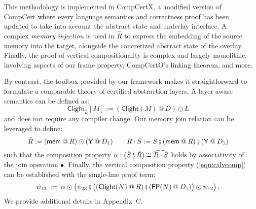 \documentclass[acmsmall,screen,review,nonacm]{acmart}
\newcommand{\kw}[1]{\ensuremath{ \mathsf{#1} }}
\newcommand{\jr}{\mathsf{Y}}
\newcommand{\vcomp}{\fatsemi}
\begin{document}
This methodology is implemented in CompCertX,
a~modified version of CompCert where
every language semantics and correctness proof
has been updated
to take into account the abstract state and underlay interface.
A complex \emph{memory injection} is used in $\hat{R}$
to express the embedding of the source memory into the target,
alongside the concretized abstract state of the overlay.
Finally, the proof of vertical compositionality
is complex and largely monolithic,
involving aspects of
our frame property,
CompCertO's linking theorem, and more.

By contrast,
the toolbox provided by our framework
makes it straightforward to formulate a comparable theory
of certified abstraction layers.
A layer-aware semantics can be defined as:
\[
  \kw{Clight}_L[M] := (\kw{Clight}(M) \mathbin@ D) \odot L
\]
and does not require any compiler change.
Our memory join relation can be leveraged to define:
\[
  \hat{R} := 
    (\kw{mem} \mathbin@ R) \odot (\jr \mathbin@ D_1)
  \qquad
  R \cdot S :=
    S \vcomp (\kw{mem} \mathbin@ R) \vcomp (\jr \mathbin@ D_1)
\]
such that the composition property
$\alpha : (\hat{S} \vcomp \hat{R}) \cong \widehat{R \cdot S}$
holds by associativity of the join operation $\bullet$.
Finally,
the vertical composition property (\ref{eqn:calvcomp})
can be established with the single-line proof term:
\[
  \psi_{13} \: := \:
    \alpha \odot \big(
    \psi_{23} \vcomp
    \big( (\kw{Clight}(N) \mathbin@ R) \vcomp
          (\kw{FP}(N) \mathbin@ D_1) \big) \odot \psi_{12} \big)
  \,.
\]
We provide additional details in Appendix~C. %
\end{document}
